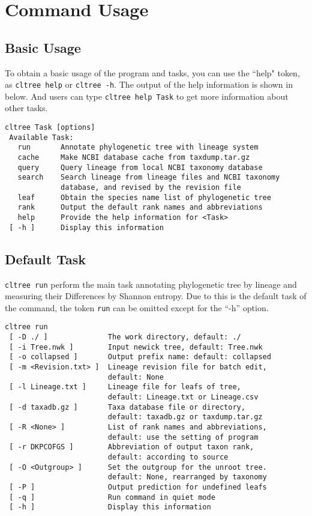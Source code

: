\documentclass[12pt,a4paper]{article}
\begin{document}
\section{Command Usage}
\subsection{Basic Usage}
To obtain a basic usage of the program and tasks, you can use the ``help" token, as {\tt cltree help} or {\tt cltree -h}. The output of the help information is shown in below. And users can type {\tt cltree help Task} to get more information about other tasks.

\begin{verbatim}
cltree Task [options]
 Available Task:
   run       Annotate phylogenetic tree with lineage system
   cache     Make NCBI database cache from taxdump.tar.gz
   query     Query lineage from local NCBI taxonomy database
   search    Search lineage from lineage files and NCBI taxonomy
             database, and revised by the revision file
   leaf      Obtain the species name list of phylogenetic tree
   rank      Output the default rank names and abbreviations
   help      Provide the help information for <Task>
 [ -h ]      Display this information
\end{verbatim}

\subsection{Default Task}
{\tt cltree run} perform the main task annotating phylogenetic tree by lineage and measuring their Differences by Shannon entropy. Due to this is the default task of the command, the token {\tt run} can be omitted except for the ``-h'' option. 
\begin{verbatim}
cltree run
 [ -D ./ ]              The work directory, default: ./
 [ -i Tree.nwk ]        Input newick tree, default: Tree.nwk
 [ -o collapsed ]       Output prefix name: default: collapsed
 [ -m <Revision.txt> ]  Lineage revision file for batch edit,
                        default: None
 [ -l Lineage.txt ]     Lineage file for leafs of tree,
                        default: Lineage.txt or Lineage.csv
 [ -d taxadb.gz ]       Taxa database file or directory,
                        default: taxadb.gz or taxdump.tar.gz
 [ -R <None> ]          List of rank names and abbreviations,
                        default: use the setting of program
 [ -r DKPCOFGS ]        Abbreviation of output taxon rank,
                        default: according to source
 [ -O <Outgroup> ]      Set the outgroup for the unroot tree.
                        default: None, rearranged by taxonomy
 [ -P ]                 Output prediction for undefined leafs
 [ -q ]                 Run command in quiet mode
 [ -h ]                 Display this information
 \end{verbatim}
\end{document}
